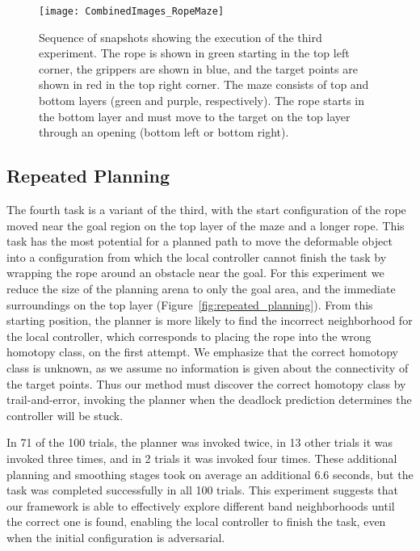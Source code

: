 \begin{figure}[h]
    \centering
    \texttt{[image: CombinedImages\_RopeMaze]}
    \vspace{-2in}
    \caption{Sequence of snapshots showing the execution of the third experiment. The rope is shown in green starting in the top left corner, the grippers are shown in blue, and the target points are shown in red in the top right corner. The maze consists of top and bottom layers (green and purple, respectively). The rope starts in the bottom layer and must move to the target on the top layer through an opening (bottom left or bottom right).}
    \label{fig:rope_maze}
\end{figure}

\FloatBarrier

\subsection{Repeated Planning}
\label{sec:repeated_rope_maze}

The fourth task is a variant of the third, with the start configuration of the rope moved near the goal region on the top layer of the maze and a longer rope. This task has the most potential for a planned path to move the deformable object into a configuration from which the local controller cannot finish the task by wrapping the rope around an obstacle near the goal. For this experiment we reduce the size of the planning arena to only the goal area, and the immediate surroundings on the top layer (Figure~\ref{fig:repeated_planning}). From this starting position, the planner is more likely to find the incorrect neighborhood for the local controller, which corresponds to placing the rope into the wrong homotopy class, on the first attempt. We emphasize that the correct homotopy class is unknown, as we assume no information is given about the connectivity of the target points. Thus our method must discover the correct homotopy class by trail-and-error, invoking the planner when the deadlock prediction determines the controller will be stuck.

In 71 of the 100 trials, the planner was invoked twice, in 13 other trials it was invoked three times, and in 2 trials it was invoked four times. These additional planning and smoothing stages took on average an additional 6.6 seconds, but the task was completed successfully in all 100 trials. This experiment suggests that our framework is able to effectively explore different band neighborhoods until the correct one is found, enabling the local controller to finish the task, even when the initial configuration is adversarial.


